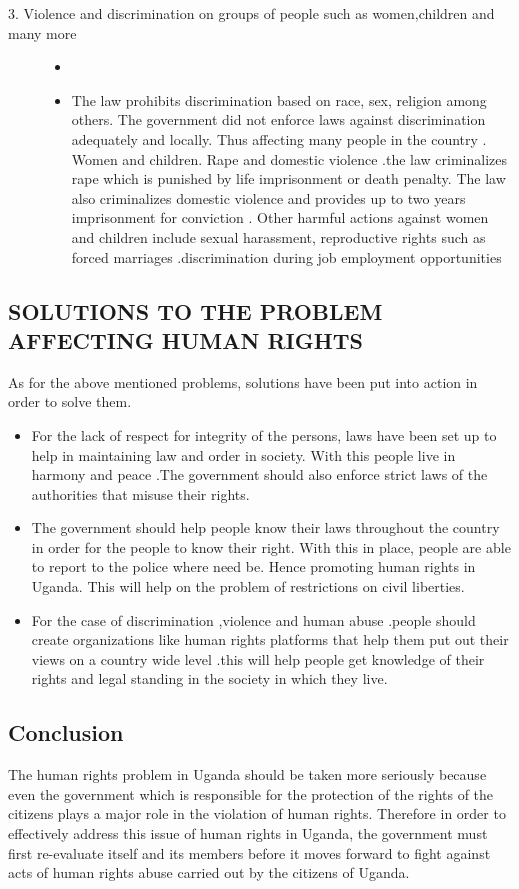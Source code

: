 \documentclass{article}
\begin{document}
\begin{description}
\begin{itemize}
\end{itemize}
\item[3.	Violence and discrimination on groups of people such as women,children and many more]
\begin{itemize}
\item []
\item
The law prohibits discrimination based on race, sex, religion among others. The government did not enforce laws against discrimination adequately and locally. Thus affecting many people in the country .
Women and children. Rape and domestic violence .the law criminalizes rape which is punished by life imprisonment or death penalty. The law also criminalizes domestic violence and provides up to two years imprisonment for conviction . Other harmful actions against women and children include sexual harassment, reproductive rights such as forced marriages .discrimination during job employment opportunities

\end{itemize}
\end{description}  
\subsection{SOLUTIONS TO THE PROBLEM AFFECTING HUMAN RIGHTS }
As for the above mentioned problems, solutions have been put into action in order to  solve them. 
\begin{itemize}
\item For the lack of respect for integrity of the persons, laws have been set up to help in maintaining law and order in society. With this people live in harmony and peace .The government should also enforce strict laws of the authorities that misuse their rights.
\item The government should help people know their laws throughout the country in order for the people to know their right. With this in place, people are able to report to the police where need be. Hence promoting human rights in Uganda. This will help on the problem of restrictions on civil liberties.
\item For the case of discrimination ,violence and human abuse .people should create organizations like human rights platforms that help them put out their views on a country wide level .this will help people get knowledge of their rights and legal standing in the society in which they live.
\end{itemize}
\subsection{ Conclusion}
The human rights problem in Uganda should be taken more seriously because even the government which is responsible for the protection of the rights of the citizens plays a major role in the violation of human rights. Therefore in order to effectively address this issue of human rights in Uganda, the government must first re-evaluate itself and its members before it moves forward to fight against acts of human rights abuse carried out by the citizens of Uganda.  
\end{document}
